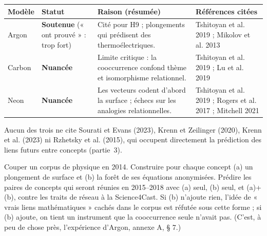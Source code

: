 \documentclass[a4paper,11pt]{article}
\makeatletter
\newenvironment{avis}{\small\renewcommand{\arraystretch}{1.15}%
\begin{longtable}{@{}>{\raggedright\arraybackslash}p{1.35cm}>{\raggedright\arraybackslash}p{2.45cm}>{\raggedright\arraybackslash}p{7.15cm}>{\raggedright\arraybackslash}p{4.4cm}@{}}
\toprule \textbf{Modèle} & \textbf{Statut} & \textbf{Raison (résumée)} & \textbf{Références citées}\\ \midrule \endhead
\bottomrule \endfoot}{\end{longtable}}
\newcommand{\st}[1]{\textbf{#1}}
\makeatother
\begin{document}
\begin{avis}
Argon & \st{Soutenue} (« ont prouvé » : trop fort) & Cité pour H9 ; plongements qui prédisent des thermoélectriques. & Tshitoyan et al. 2019 ; Mikolov et al. 2013\\ \midrule
Carbon & \st{Nuancée} & Limite critique : la cooccurrence confond thème et isomorphisme relationnel. & Tshitoyan et al. 2019 ; Lu et al. 2019\\ \midrule
Neon & \st{Nuancée} & Les vecteurs codent d'abord la surface ; échecs sur les analogies relationnelles. & Tshitoyan et al. 2019 ; Rogers et al. 2017 ; Mitchell 2021\\
\end{avis}
Aucun des trois ne cite Sourati et Evans (2023), Krenn et Zeilinger (2020), Krenn et al. (2023) ni Rzhetsky et al. (2015), qui occupent directement la prédiction des liens futurs entre concepts (partie~3).

\begin{exemple}
Couper un corpus de physique en 2014. Construire pour chaque concept (a) un plongement de surface et (b) la forêt de ses équations anonymisées. Prédire les paires de concepts qui seront réunies en 2015–2018 avec (a) seul, (b) seul, et (a)+(b), contre les traits de réseau à la Science4Cast. Si (b) n'ajoute rien, l'idée de « vrais liens mathématiques » cachés dans le corpus est réfutée sous cette forme ; si (b) ajoute, on tient un instrument que la cooccurrence seule n'avait pas. (C'est, à peu de chose près, l'expérience d'Argon, annexe A, § 7.)
\end{exemple}
\end{document}
